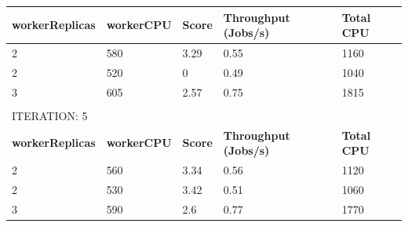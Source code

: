\begin{table}[H]
\begin{tabular}{lllll}
\multicolumn{1}{|l|}{\textbf{workerReplicas}} & \multicolumn{1}{l|}{\textbf{workerCPU}} & \multicolumn{1}{l|}{\textbf{Score}} & \multicolumn{1}{l|}{\textbf{Throughput (Jobs/s)}} & \multicolumn{1}{l|}{\textbf{Total CPU}} \\ \hline
\multicolumn{1}{|l|}{2}                       & \multicolumn{1}{l|}{580}                & \multicolumn{1}{l|}{3.29}           & \multicolumn{1}{l|}{0.55}                        & \multicolumn{1}{l|}{1160}               \\ \hline
\multicolumn{1}{|l|}{2}                       & \multicolumn{1}{l|}{520}                & \multicolumn{1}{l|}{0}              & \multicolumn{1}{l|}{0.49}                        & \multicolumn{1}{l|}{1040}               \\ \hline
\multicolumn{1}{|l|}{3}                       & \multicolumn{1}{l|}{605}                & \multicolumn{1}{l|}{2.57}           & \multicolumn{1}{l|}{0.75}                        & \multicolumn{1}{l|}{1815}               \\ \hline
                                              &                                         &                                     &                                                  &                                         \\
ITERATION: 5                                  &                                         &                                     &                                                  &                                         \\ \hline
\multicolumn{1}{|l|}{\textbf{workerReplicas}} & \multicolumn{1}{l|}{\textbf{workerCPU}} & \multicolumn{1}{l|}{\textbf{Score}} & \multicolumn{1}{l|}{\textbf{Throughput (Jobs/s)}} & \multicolumn{1}{l|}{\textbf{Total CPU}} \\ \hline
\multicolumn{1}{|l|}{2}                       & \multicolumn{1}{l|}{560}                & \multicolumn{1}{l|}{3.34}           & \multicolumn{1}{l|}{0.56}                        & \multicolumn{1}{l|}{1120}               \\ \hline
\multicolumn{1}{|l|}{2}                       & \multicolumn{1}{l|}{530}                & \multicolumn{1}{l|}{3.42}           & \multicolumn{1}{l|}{0.51}                        & \multicolumn{1}{l|}{1060}               \\ \hline
\multicolumn{1}{|l|}{3}                       & \multicolumn{1}{l|}{590}                & \multicolumn{1}{l|}{2.6}            & \multicolumn{1}{l|}{0.77}                        & \multicolumn{1}{l|}{1770}               \\ \hline
\end{tabular}
\end{table}

